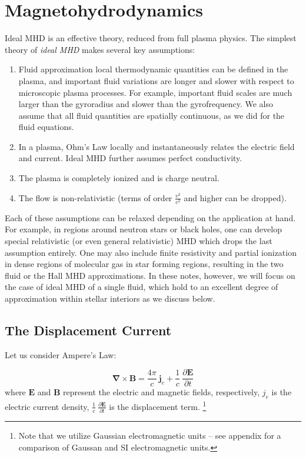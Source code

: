 \documentclass[notoc]{tufte-handout}
\renewcommand{\vec}[1]{
\mathbf{#1}
}
\begin{document}
\vfill\eject


\section{Magnetohydrodynamics}
Ideal MHD is an effective theory, reduced from full plasma physics. The simplest theory of {\it ideal MHD} makes several key assumptions:
\begin{enumerate}
    \item Fluid approximation \textemdash local thermodynamic quantities can be defined in the plasma, and important fluid variations are longer and slower with respect to microscopic plasma processes. For example, important fluid scales are much larger than the gyroradius and slower than the gyrofrequency. We also assume that all fluid quantities are spatially continuous, as we did for the fluid equations.

    \item In a plasma, Ohm's Law locally and instantaneously relates the electric field and current. Ideal MHD further assumes perfect conductivity. 

    \item The plasma is completely ionized and is charge neutral.

    \item The flow is non-relativistic (terms of order $\frac{v^2}{c^2}$ and higher can be dropped).
\end{enumerate}
%
Each of these assumptions can be relaxed depending on the application at hand. For example, in regions around neutron stars or black holes, one can develop special relativistic (or even general relativistic) MHD which drops the last assumption entirely. One may also include finite resistivity and  partial ionization in dense regions of molecular gas in star forming regions, resulting in the two fluid or the Hall MHD approximations. In these notes, however, we will focus on the case of  ideal MHD of a single fluid, which hold to an excellent degree of approximation within stellar interiors as we discuss below.

\subsection{The Displacement Current}

Let us consider Ampere's Law:

\begin{equation}
\vec{\nabla} \times \vec{B} = \frac{4\pi }{c}~\vec{j}_e + \frac{1}{c}~\frac{\partial\vec{E}}{\partial t}
\end{equation}
where $\vec {E}$ and $\vec {B}$ represent the electric and magnetic fields, respectively, $j_e$ is the electric current density, $\frac{1}{c}~\frac{\partial\vec{E}}{\partial t}$ is the displacement term.
%
\footnote {Note that we utilize Gaussian electromagnetic units -- see appendix for a comparison of Gaussan and SI electromagnetic units.}
\end{document}
